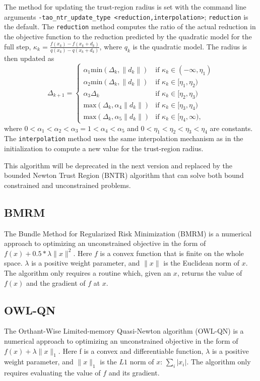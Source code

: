The method for updating the trust-region radius is set with the 
command line arguments 
{\tt -tao\_ntr\_update\_type <reduction,interpolation>}; {\tt reduction} 
is the default.  The {\tt reduction} method computes the ratio of the 
actual reduction in the objective function to the reduction predicted 
by the quadratic model for the full step, 
$\kappa_k = \frac{f(x_k) - f(x_k + d_k)}{q(x_k) - q(x_k + d_k)}$, where 
$q_k$ is the quadratic model.  The radius is then updated as
\[
\Delta_{k+1} = \left\{\begin{array}{ll}
\alpha_1 \mbox{min}(\Delta_k, \|d_k\|) & \mbox{if } \kappa_k \in (-\infty, \eta_1) \\
\alpha_2 \mbox{min}(\Delta_k, \|d_k\|) & \mbox{if } \kappa_k \in [\eta_1, \eta_2) \\
\alpha_3 \Delta_k & \mbox{if } \kappa_k \in [\eta_2, \eta_3) \\
\mbox{max}(\Delta_k, \alpha_4 \|d_k\|) & \mbox{if } \kappa_k \in [\eta_3, \eta_4) \\
\mbox{max}(\Delta_k, \alpha_5 \|d_k\|) & \mbox{if } \kappa_k \in [\eta_4, \infty),
\end{array}
\right.
\]
where $0 < \alpha_1 < \alpha_2 < \alpha_3 = 1 < \alpha_4 < \alpha_5$ and
$0 < \eta_1 < \eta_2 < \eta_3 < \eta_4$ are constants.  The {\tt interpolation}
method uses the same interpolation mechanism as in the initialization to
compute a new value for the trust-region radius.

This algorithm will be deprecated in the next version and replaced by the 
bounded Newton Trust Region (BNTR) algorithm that can solve both bound constrained 
and unconstrained problems.

\subsection{BMRM}
The Bundle Method for Regularized Risk Minimization (BMRM)\cite{brmrm} is a 
numerical approach to optimizing an unconstrained objective in the form of 
$f(x) + 0.5 * \lambda \| x \|^2$.  Here $f$ is a convex function that is finite on 
the whole space.  $\lambda$ is a positive 
weight parameter, and $\| x \|$ is the Euclidean norm of $x$.  The algorithm only 
requires a routine which, given an $x$, returns the value of $f(x)$ and the 
gradient of $f$ at $x$.

\subsection{OWL-QN}
The Orthant-Wise Limited-memory Quasi-Newton algorithm (OWL-QN)\cite{owlqn}
is a numerical approach to optimizing an unconstrained objective in the 
form of $f(x) + \lambda \|x\|_1$.  Here f is a convex and differentiable 
function, $\lambda$ is a positive weight parameter, and $\| x \|_1$ is the 
$L1$ norm of $x$: $\sum_i |x_i|$.  The algorithm only requires evaluating the 
value of $f$ and its gradient.

